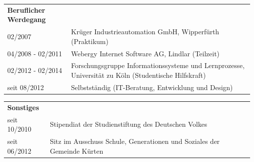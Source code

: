 \begin{flushleft}
\vspace{0.5em}

\begin{tabular}{p{11em} p{22.5em}}
    \textbf{Beruflicher Werdegang} & \addspace \\
    02/2007 & Krüger Industrieautomation GmbH, Wipperfürth (Praktikum) \\
    04/2008 - 02/2011 & Webergy Internet Software AG, Lindlar (Teilzeit) \\
    02/2012 - 02/2014 & Forschungsgruppe Informationssysteme und Lernprozesse, Universität zu Köln (Studentische Hilfskraft) \\
    seit 08/2012 & Selbstständig (IT-Beratung, Entwicklung und Design) \\
\end{tabular}

\vspace{0.5em}

\begin{tabular}{p{11em} p{22.5em}}
    \textbf{Sonstiges} & \addspace \\
    seit 10/2010 & Stipendiat der Studienstiftung des Deutschen Volkes \\
    seit 06/2012 & Sitz im Ausschuss Schule, Generationen und Soziales der Gemeinde Kürten\\
\end{tabular}


\vspace{-1em}

\end{flushleft}